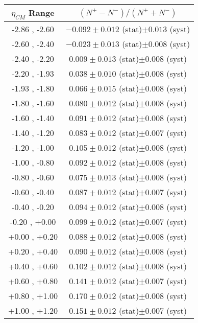 \begin{table}[h!]
  \centering
  \renewcommand{\arraystretch}{1.5}
  \begin{tabular}{|c|*1c|}
    \hline
    $\eta_{CM}$ Range & $( N^{+} - N^{-} ) / ( N^{+} + N^{-} )$\\
    \hline\hline
    -2.86 , -2.60 & $-0.092 \pm 0.012$ (stat)$ \pm 0.013$ (syst)\\
    \hline
    -2.60 , -2.40 & $-0.023 \pm 0.013$ (stat)$ \pm 0.008$ (syst)\\
    \hline
    -2.40 , -2.20 & $0.009 \pm 0.013$ (stat)$ \pm 0.008$ (syst)\\
    \hline
    -2.20 , -1.93 & $0.038 \pm 0.010$ (stat)$ \pm 0.008$ (syst)\\
    \hline
    -1.93 , -1.80 & $0.066 \pm 0.015$ (stat)$ \pm 0.008$ (syst)\\
    \hline
    -1.80 , -1.60 & $0.080 \pm 0.012$ (stat)$ \pm 0.008$ (syst)\\
    \hline
    -1.60 , -1.40 & $0.091 \pm 0.012$ (stat)$ \pm 0.008$ (syst)\\
    \hline
    -1.40 , -1.20 & $0.083 \pm 0.012$ (stat)$ \pm 0.007$ (syst)\\
    \hline
    -1.20 , -1.00 & $0.105 \pm 0.012$ (stat)$ \pm 0.008$ (syst)\\
    \hline
    -1.00 , -0.80 & $0.092 \pm 0.012$ (stat)$ \pm 0.008$ (syst)\\
    \hline
    -0.80 , -0.60 & $0.075 \pm 0.013$ (stat)$ \pm 0.008$ (syst)\\
    \hline
    -0.60 , -0.40 & $0.087 \pm 0.012$ (stat)$ \pm 0.007$ (syst)\\
    \hline
    -0.40 , -0.20 & $0.094 \pm 0.012$ (stat)$ \pm 0.008$ (syst)\\
    \hline
    -0.20 , +0.00 & $0.099 \pm 0.012$ (stat)$ \pm 0.007$ (syst)\\
    \hline
    +0.00 , +0.20 & $0.088 \pm 0.012$ (stat)$ \pm 0.008$ (syst)\\
    \hline
    +0.20 , +0.40 & $0.090 \pm 0.012$ (stat)$ \pm 0.008$ (syst)\\
    \hline
    +0.40 , +0.60 & $0.102 \pm 0.012$ (stat)$ \pm 0.008$ (syst)\\
    \hline
    +0.60 , +0.80 & $0.141 \pm 0.012$ (stat)$ \pm 0.007$ (syst)\\
    \hline
    +0.80 , +1.00 & $0.170 \pm 0.012$ (stat)$ \pm 0.008$ (syst)\\
    \hline
    +1.00 , +1.20 & $0.151 \pm 0.012$ (stat)$ \pm 0.007$ (syst)\\

\end{tabular}
\end{table}
